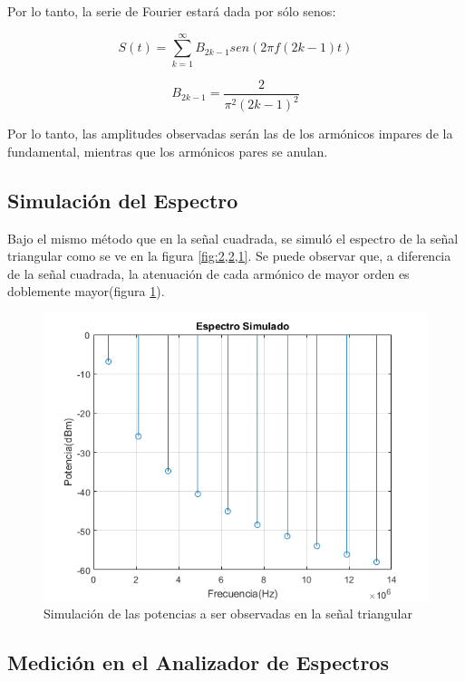     Por lo tanto, la serie de Fourier estará dada por sólo senos:

    \begin{equation}
        S(t) = \sum_{k=1}^{\infty} B_{2k-1} sen(2 \pi f (2k-1) t)
    \end{equation}

    \begin{equation}
        B_{2k-1} =\frac{2}{\pi^2 (2k-1)^2}
    \end{equation}

    Por lo tanto, las amplitudes observadas serán las de los armónicos
    impares de la fundamental, mientras que los armónicos pares se anulan.

    \subsection{Simulación del Espectro}
    Bajo el mismo método que en la señal cuadrada, se simuló el espectro
    de la señal triangular como se ve en la figura \ref{fig:2,2,1}. Se puede
    observar que, a diferencia de la señal cuadrada, la atenuación de cada
    armónico de mayor orden es doblemente mayor(figura \ref{fig:2,2,2}).

    \begin{figure}[ht]
        \begin{center}
            \includegraphics[width=0.7\linewidth]{contenido/img/spect_tri.png}
            \caption{Simulación de las potencias a ser observadas en la señal triangular}
            \label{fig:2,2,2}
        \end{center}
    \end{figure}

    \subsection{Medición en el Analizador de Espectros}

